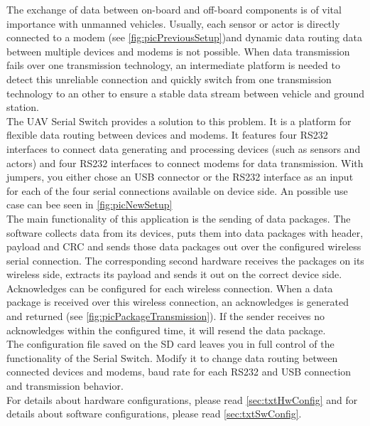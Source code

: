 %
%
The exchange of data between on-board and off-board components is of vital importance with unmanned vehicles. Usually, each sensor or actor is directly connected to a modem (see \autoref{fig:picPreviousSetup})and dynamic data routing data between multiple devices and modems is not possible. When data transmission fails over one transmission technology, an intermediate platform is needed to detect this unreliable connection and quickly switch from one transmission technology to an other to ensure a stable data stream between vehicle and ground station.\\
%
The UAV Serial Switch provides a solution to this problem. It is a platform for flexible data routing between devices and modems. It features four RS232 interfaces to connect data generating and processing devices (such as sensors and actors) and four RS232 interfaces to connect modems for data transmission. With jumpers, you either chose an USB connector or the RS232 interface as an input for each of the four serial connections available on device side. An possible use case can bee seen in \autoref{fig:picNewSetup} \\
%
The main functionality of this application is the sending of data packages. The software collects data from its devices, puts them into data packages with header, payload and CRC and sends those data packages out over the configured wireless serial connection. The corresponding second hardware receives the packages on its wireless side, extracts its payload and sends it out on the correct device side.\\
Acknowledges can be configured for each wireless connection. When a data package is received over this wireless connection, an acknowledges is generated and returned (see \autoref{fig:picPackageTransmission}). If the sender receives no acknowledges within the configured time, it will resend the data package. \\
The configuration file saved on the SD card leaves you in full control of the functionality of the Serial Switch. Modify it to change data routing between connected devices and modems, baud rate for each RS232 and USB connection and transmission behavior.\\
For details about hardware configurations, please read \autoref{sec:txtHwConfig} and for details about software configurations, please read \autoref{sec:txtSwConfig}.